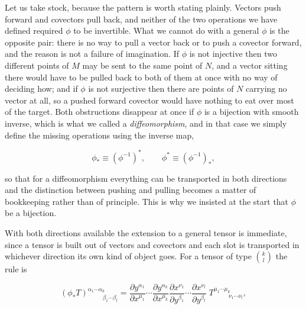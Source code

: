         Let us take stock, because the pattern is worth stating plainly. Vectors push forward and covectors pull back, and neither of the two operations we have defined required $\phi$ to be invertible. What we cannot do with a general $\phi$ is the opposite pair: there is no way to pull a vector back or to push a covector forward, and the reason is not a failure of imagination. If $\phi$ is not injective then two different points of $M$ may be sent to the same point of $N$, and a vector sitting there would have to be pulled back to both of them at once with no way of deciding how; and if $\phi$ is not surjective then there are points of $N$ carrying no vector at all, so a pushed forward covector would have nothing to eat over most of the target. Both obstructions disappear at once if $\phi$ is a bijection with smooth inverse, which is what we called a \textit{diffeomorphism}, and in that case we simply define the missing operations using the inverse map,

        \begin{equation}\label{eq:DiffeoBothWays}
            \phi_{*} \equiv \left(\phi^{-1}\right)^{*}, \qquad \phi^{*} \equiv \left(\phi^{-1}\right)_{*},
        \end{equation}

        so that for a diffeomorphism everything can be transported in both directions and the distinction between pushing and pulling becomes a matter of bookkeeping rather than of principle. This is why we insisted at the start that $\phi$ be a bijection.

        With both directions available the extension to a general tensor is immediate, since a tensor is built out of vectors and covectors and each slot is transported in whichever direction its own kind of object goes. For a tensor of type $\binom{k}{l}$ the rule is

        \begin{equation}\label{eq:PushTensor}
            \left(\phi_{*}T\right)^{\alpha_1\cdots\alpha_k}_{\qquad\;\;\beta_1\cdots\beta_l} = \frac{\partial y^{\alpha_1}}{\partial x^{\mu_1}}\cdots\frac{\partial y^{\alpha_k}}{\partial x^{\mu_k}}\frac{\partial x^{\nu_1}}{\partial y^{\beta_1}}\cdots\frac{\partial x^{\nu_l}}{\partial y^{\beta_l}}\;T^{\mu_1\cdots\mu_k}_{\qquad\;\;\nu_1\cdots\nu_l},
        \end{equation}

